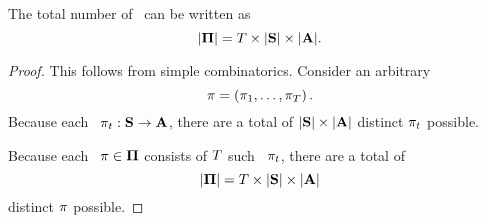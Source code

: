 \documentclass{rl_theory/proof}
\begin{document}
\begin{proposition}
  The total number of \strs\ can be written as
  $$|{\mathbf \Pi}| = T \times |{\mathbf S}| \times |{\mathbf A}|.$$%
\end{proposition}

\begin{proof}
  This follows from simple combinatorics.
  Consider an arbitrary \str
  $$\pi = \left(\pi_{1},\ldots,\pi_{T}\right).$$
  Because each \stpstr\ $\pi_t : {\mathbf S} \rightarrow {\mathbf A}$,
  there are a total of $|{\mathbf S}| \times |{\mathbf A}|$ distinct $\pi_t$ possible.

  Because each \str\ $\pi \in {\mathbf \Pi}$ consists of $T$ such \stpstrs\ $\pi_t$,
  there are a total of 
  $$|{\mathbf \Pi}| = T \times |{\mathbf S}| \times |{\mathbf A}|$$
  distinct $\pi$ possible.
\end{proof}
\end{document}
